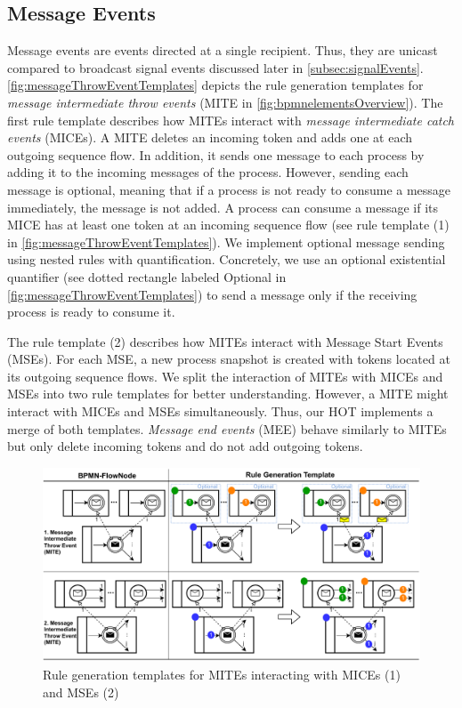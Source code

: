 \documentclass{lmcs} %
\begin{document}
\subsection{Message Events}
Message events are events directed at a single recipient.
Thus, they are unicast compared to broadcast signal events discussed later in \autoref{subsec:signalEvents}.
\autoref{fig:messageThrowEventTemplates} depicts the rule generation templates for \textit{message intermediate throw events} (\textsf{MITE} in \autoref{fig:bpmnelementsOverview}).
The first rule template describes how MITEs interact with \textit{message intermediate catch events} (MICEs).
A MITE deletes an incoming token and adds one at each outgoing sequence flow.
In addition, it sends one message to each process by adding it to the incoming messages of the process.
However, sending each message is optional, meaning that if a process is not ready to consume a message immediately, the message is not added.
A process can consume a message if its MICE has at least one token at an incoming sequence flow (see rule template (1) in \autoref{fig:messageThrowEventTemplates}).
We implement optional message sending using nested rules with quantification.
Concretely, we use an optional existential quantifier \cite{rensinkNestedQuantificationGraph2006} (see dotted rectangle labeled \textsf{Optional} in \autoref{fig:messageThrowEventTemplates}) to send a message only if the receiving process is ready to consume it.

The rule template (2) describes how MITEs interact with Message Start Events (MSEs).
For each MSE, a new process snapshot is created with tokens located at its outgoing sequence flows.
We split the interaction of MITEs with MICEs and MSEs into two rule templates for better understanding.
However, a MITE might interact with MICEs and MSEs simultaneously.
Thus, our HOT implements a merge of both templates. 
\textit{Message end events} (\textsf{MEE}) behave similarly to MITEs but only delete incoming tokens and do not add outgoing tokens.

\begin{figure}[ht]
    \centering
    \includegraphics[width=1\textwidth]{images/mite_template.pdf}
    \caption{Rule generation templates for MITEs interacting with MICEs (1) and MSEs (2)}
    \label{fig:messageThrowEventTemplates}
\end{figure}
\end{document}
